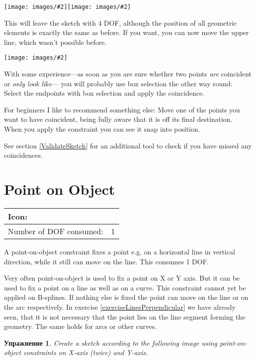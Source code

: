 \documentclass[12pt,titlepage]{article}
\newcommand{\icon}[1]{\raisebox{-1em}{\rule{0pt}{27pt}\texttt{[image: images/\#1]}}}
\newcommand{\img}[2]{\vspace{2ex}\noindent\texttt{[image: images/\#2]}}
\newcommand{\dofConsumed}{Number of DOF consumed:}
\newtheorem{Exercise}{Упражнение}
\begin{document}
\begin {itemize}
\img{scale=0.9}{Coincidence2}\hspace{2em}\img{scale=0.9}{Coincidence3}

This will leave the sketch with 4 DOF, although the position of all geometric
elements is exactly the same as before. If you want, you can now move the upper line,
which wasn't possible before.

\img{scale=0.7}{Coincidence4}

With some experience---as soon as you are sure whether two points \emph{are} coincident
or \emph{only look like}--- you will probably use box selection the other way
round: Select the endpoints with box selection and apply the coincidence.

For beginners I like to recommend something else: Move one of the points you want to
have coincident, being fully aware that it is off its final destination. When you
apply the constraint you can see it snap into position.

See section \vref{ValidateSketch} for an additional tool to check if you have missed any
coincidences.


\section{Point on Object}
\label{PointOnObject}
\begin{tabular}{|l|l|}
\hline
Icon: & \icon{Constraint_PointOnObject}\\
\hline
\dofConsumed & 1 \\
\hline
\end{tabular}

A point-on-object constraint fixes a point e.g. on a horizontal line in vertical direction, while it still
can move on the line. This consumes 1 DOF.


Very often point-on-object is used to fix a point on X or Y axis. But it can be used
to fix a point on a line as well as on a curve. This constraint cannot yet be applied
on B-splines. If nothing else is fixed the point can move on the line or on the arc
respectively.
In exercise \vref{exerciseLinesPerpendicular} we have already seen, that it is not
necessary that the point lies on the line segment forming the geometry. The same
holds for arcs or other curves.

\begin{Exercise}
Create a sketch according to the following image using point-on-object constraints on
X-axis (twice) and Y-axis.


\end{Exercise}
\end{itemize}
\end{document}
